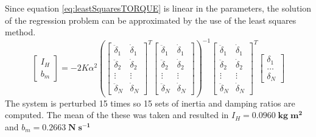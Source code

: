 Since equation \ref{eq:leastSquaresTORQUE} is linear in the parameters, the solution of the regression problem can be approximated by the use of the least squares method.
\begin{equation}
 \begin{bmatrix}
    I_H \\ b_m
\end{bmatrix} = -2K\alpha^2 \left(      \begin{bmatrix}
    \ddot{\delta}_1 & \dot{\delta}_1   \\ \ddot{\delta}_2 & \dot{\delta}_2 \\ \vdots & \vdots \\ \ddot{\delta}_N & \dot{\delta}_N 
\end{bmatrix} ^{T}       \begin{bmatrix}
    \ddot{\delta}_1 & \dot{\delta}_1   \\ \ddot{\delta}_2 & \dot{\delta}_2 \\ \vdots & \vdots \\ \ddot{\delta}_N & \dot{\delta}_N 
\end{bmatrix} \right)^{-1}      \begin{bmatrix}
    \ddot{\delta}_1 & \dot{\delta}_1   \\ \ddot{\delta}_2 & \dot{\delta}_2 \\ \vdots & \vdots \\ \ddot{\delta}_N & \dot{\delta}_N 
\end{bmatrix} ^{T}  \begin{bmatrix}
    \delta_1 \\ \ldots \\ \delta_N
\end{bmatrix}
\label{eq:leastSOLUTION}
\end{equation}
The system is perturbed 15 times so 15 sets of inertia and damping ratios are computed. The mean of the these was taken and  resulted in  \ensuremath{I_H = \mathbf{0.0960 \;kg\; m^2}} and   \ensuremath{b_m = \mathbf{0.2663\; N\; s^{-1}}}




